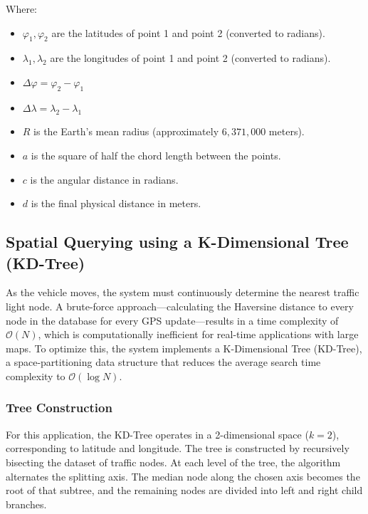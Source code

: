 Where:
\begin{itemize}
    \item $\varphi_1, \varphi_2$ are the latitudes of point 1 and point 2 (converted to radians).
    \item $\lambda_1, \lambda_2$ are the longitudes of point 1 and point 2 (converted to radians).
    \item $\Delta \varphi = \varphi_2 - \varphi_1$
    \item $\Delta \lambda = \lambda_2 - \lambda_1$
    \item $R$ is the Earth's mean radius (approximately $6,371,000$ meters).
    \item $a$ is the square of half the chord length between the points.
    \item $c$ is the angular distance in radians.
    \item $d$ is the final physical distance in meters.
\end{itemize}

\subsection{Spatial Querying using a K-Dimensional Tree (KD-Tree)}

As the vehicle moves, the system must continuously determine the nearest traffic light node. A brute-force approach—calculating the Haversine distance to every node in the database for every GPS update—results in a time complexity of $\mathcal{O}(N)$, which is computationally inefficient for real-time applications with large maps. To optimize this, the system implements a K-Dimensional Tree (KD-Tree), a space-partitioning data structure that reduces the average search time complexity to $\mathcal{O}(\log N)$.

\subsubsection{Tree Construction}
For this application, the KD-Tree operates in a 2-dimensional space ($k=2$), corresponding to latitude and longitude. The tree is constructed by recursively bisecting the dataset of traffic nodes. At each level of the tree, the algorithm alternates the splitting axis. The median node along the chosen axis becomes the root of that subtree, and the remaining nodes are divided into left and right child branches.

\begin{algorithm}[H]
\caption{Build KD-Tree}
\label{alg:build_kdtree}
\end{algorithm}

